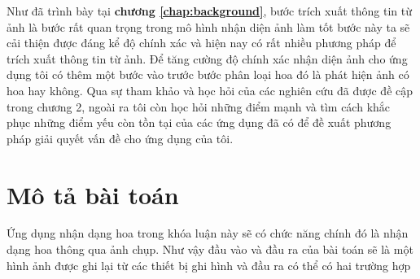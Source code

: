 \documentclass[12pt]{report}
\begin{document}
		Như đã trình bày tại \textbf{chương \ref{chap:background}}, bước trích xuất thông tin từ ảnh là bước rất quan trọng trong mô hình nhận diện ảnh làm tốt bước này ta sẽ cải thiện được đáng kể độ chính xác và hiện nay có rất nhiều phương pháp để trích xuất thông tin từ ảnh. 
		Để tăng cường độ chính xác nhận diện ảnh cho ứng dụng tôi có thêm một bước vào trước bước phân loại hoa đó là phát hiện ảnh có hoa hay không. Qua sự tham khảo và học hỏi của các nghiên cứu đã được đề cập trong chương 2, ngoài ra tôi còn học hỏi những điểm mạnh và tìm cách khắc phục những điểm yếu còn tồn tại
		của các ứng dụng đã có để đề xuất phương pháp giải quyết vấn đề cho ứng dụng của tôi.

																
																
																
		\section{Mô tả bài toán}
		Ứng dụng nhận dạng hoa trong khóa luận này sẽ có chức năng chính đó là nhận dạng hoa thông qua ảnh chụp. Như vậy đầu vào và đầu ra của bài toán sẽ là một hình ảnh được ghi lại từ các thiết bị ghi hình và đầu ra có thể có hai trường hợp																																																																			
																					
\end{document}
